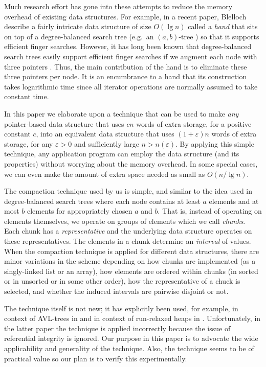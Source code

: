 \documentclass{DIKU-article}
\begin{document}
Much research effort has gone into these attempts to reduce the memory
overhead of existing data structures.  For example, in a recent
paper, Blelloch \etal\ \cite{bmw03} describe a fairly intricate data
structure of size $O(\lg n)$ called a \emph{hand} that sits on top of
a degree-balanced search tree (e.g.~an $(a,b)$-tree \cite{hm82}) so
that it supports efficient finger searches.  However, it has long been
known that degree-balanced search trees easily support efficient
finger searches if we augment each node with three pointers
\cite{bt80}.  Thus, the main contribution of the hand is to eliminate
these three pointers per node. It is an encumbrance to a hand that its
construction takes logarithmic time since all iterator operations are
normally assumed to take constant time.

In this paper we elaborate upon a technique that can be used to make
\emph{any} pointer-based data structure that uses $cn$ words of extra
storage, for a positive constant $c$, into an equivalent data
structure that uses $(1 + \varepsilon) n$ words of extra storage, for
any $\varepsilon>0$ and sufficiently large $n > n(\varepsilon)$.  By
applying this simple technique, any application program can employ the
data structure (and its properties) without worrying about the memory
overhead. In some special cases, we can even make the amount of extra
space needed as small as $O(n/\lg n)$.

The compaction technique used by us is simple, and similar to the idea
used in degree-balanced search trees \cite{hm82} where each node
contains at least $a$ elements and at most $b$ elements for
appropriately chosen $a$ and $b$. That is, instead of operating on
elements themselves, we operate on groups of elements which we call
\emph{chunks}. Each chunk has a \emph{representative} and the
underlying data structure operates on these representatives. The
elements in a chunk determine an \emph{interval} of values. When the
compaction technique is applied for different data structures, there
are minor variations in the scheme depending on how chunks are
implemented (as a singly-linked list or an array), how elements are
ordered within chunks (in sorted or in unsorted or in some other
order), how the representative of a chuck is selected, and whether the
induced intervals are pairwise disjoint or not.

The technique itself is not new; it has explicitly been used, for
example, in context of AVL-trees in \cite{Mun86} and in context of
run-relaxed heaps in \cite{DGST88}. Unfortunately, in the latter paper
the technique is applied incorrectly because the issue of referential
integrity is ignored.  Our purpose in this paper is to advocate the
wide applicability and generality of the technique.  Also, the
technique seems to be of practical value so our plan is to verify this
experimentally.
\end{document}
